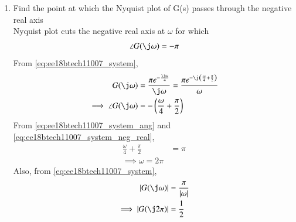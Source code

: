 \begin{enumerate}[label=\thesubsection.\arabic*.,ref=\thesubsection.\theenumi]
\begin{figure}[!h]
  \caption{}
  \label{fig:ee18btech11007}
\end{figure}
%
\item Find the point at which the Nyquist plot of G(s) passes through the negative real axis
\\
\solution  Nyquist plot cuts the negative real axis at $\omega $ for which 
\begin{align}
\angle G(\j\omega)=-\pi
\label{eq:ee18btech11007_system_neg_real}
\end{align}
From \eqref{eq:ee18btech11007_system},
\begin{align}
 G(\j\omega)&=\frac{\pi e^{-\frac{\j\omega}{4}}}{\j\omega} = \frac{\pi e^{-\j\brak{\frac{\omega}{4}+\frac{\pi}{2}}}}{\omega}
\\
\implies \angle{ G(\j\omega)} &= -\brak{\frac{\omega}{4}+\frac{\pi}{2}}
\label{eq:ee18btech11007_system_ang}
\end{align}
From \eqref{eq:ee18btech11007_system_ang} and \eqref{eq:ee18btech11007_system_neg_real}, 
\begin{align}
\frac{\omega}{4}+\frac{\pi}{2} &= \pi
\\
\implies \omega = 2\pi
\end{align}
Also, from \eqref{eq:ee18btech11007_system},
\begin{align}
\label{eq:ee18btech11007_system_mod}
\abs{ G(\j\omega)}&=\frac{\pi }{\abs{\omega}}
\\
\implies \abs{ G(\j2\pi)} &= \frac{1}{2}
\end{align}
%


\end{enumerate}
